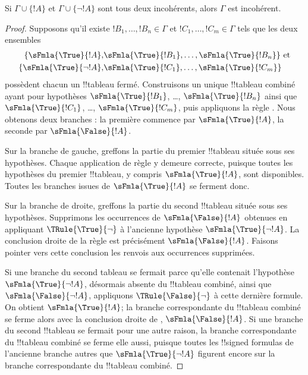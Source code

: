 \documentclass[../../../include/open-logic-section]{subfiles}
\begin{document}
%
%
%
%
%
%

\begin{prop}
  Si $\Gamma \cup \{!A\}$ et $\Gamma \cup \{\lnot !A\}$ sont tous
  deux incohérents, alors $\Gamma$ est incohérent.
\end{prop}

\begin{proof}
  Supposons qu'il existe $!B_1, \dots, !B_n \in \Gamma$ et
  $!C_1, \dots, !C_m \in \Gamma$ tels que les deux ensembles
  \begin{align*}
    \{\sFmla{\True}{!A}, &
    \sFmla{\True}{!B_1}, \dots, \sFmla{\True}{!B_n}\} \text{ et}\\
    \{\sFmla{\True}{\lnot !A}, &
    \sFmla{\True}{!C_1}, \dots, \sFmla{\True}{!C_m}\}
  \end{align*}
  possèdent chacun un !!{tableau} fermé. Construisons un unique
  !!{tableau} combiné ayant pour hypothèses
  $\sFmla{\True}{!B_1}$, \dots, $\sFmla{\True}{!B_n}$ ainsi que
  $\sFmla{\True}{!C_1}$, \dots, $\sFmla{\True}{!C_m}$, puis appliquons
  la règle \Cut{}. Nous obtenons deux branches : la première commence
  par $\sFmla{\True}{!A}$, la seconde par $\sFmla{\False}{!A}$.
  
  Sur la branche de gauche, greffons la partie du premier !!{tableau}
  située sous ses hypothèses. Chaque application de règle y demeure
  correcte, puisque toutes les hypothèses du premier !!{tableau}, y
  compris $\sFmla{\True}{!A}$, sont disponibles. Toutes les branches
  issues de $\sFmla{\True}{!A}$ se ferment donc.
  
Sur la branche de droite, greffons la partie du second !!{tableau}
située sous ses hypothèses. Supprimons les occurrences de
$\sFmla{\False}{!A}$ obtenues en appliquant $\TRule{\True}{\lnot}$
à l'ancienne hypothèse $\sFmla{\True}{\lnot !A}$.
La conclusion droite de la règle \Cut{} est précisément
$\sFmla{\False}{!A}$. Faisons pointer vers cette conclusion
les renvois aux occurrences supprimées.

  Si une branche du second tableau se fermait parce qu'elle contenait
  l'hypothèse $\sFmla{\True}{\lnot !A}$, désormais absente du
  !!{tableau} combiné, ainsi que $\sFmla{\False}{\lnot !A}$, appliquons
  $\TRule{\False}{\lnot}$ à cette dernière formule. On obtient
  $\sFmla{\True}{!A}$; la branche correspondante du !!{tableau}
  combiné se ferme alors avec la conclusion droite de \Cut{},
  $\sFmla{\False}{!A}$. Si une branche du second !!{tableau} se fermait
  pour une autre raison, la branche correspondante du !!{tableau}
  combiné se ferme elle aussi, puisque toutes les !!{signed formula}s
  de l'ancienne branche autres que $\sFmla{\True}{\lnot !A}$ figurent
  encore sur la branche correspondante du !!{tableau} combiné.
  \end{proof}
\end{document}
